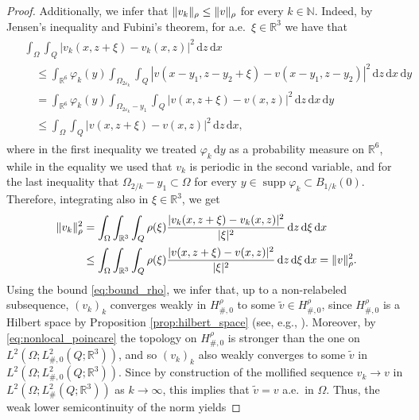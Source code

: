 \documentclass[reqno,11pt]{amsart}
\numberwithin{equation}{section}
\theoremstyle{thmlemcorr}
\numberwithin{theorem}{section}
\theoremstyle{thmlemcorr*}
\theoremstyle{defi}
\theoremstyle{remexample}
\theoremstyle{ass}
\newcommand{\N}{\mathbb{N}}
\newcommand{\R}{\mathbb{R}}
\DeclarePairedDelimiter{\norm}{\lVert}{\rVert}
\newcommand{\1}{\mathds{1}}
\DeclareMathOperator{\supp}{supp}
\newcommand{\Om}{\Omega}
\newcommand{\veps}{\varepsilon}
\newcommand{\dl}{\,\mathrm{d}}
\begin{document}
\begin{proof}
    Additionally, we infer that \(\norm{v_k}_\rho\le \norm{v}_\rho\) for every \(k\in\N\). Indeed, by Jensen's inequality and Fubini's theorem, for a.e.~\(\xi \in \R^3\) we have that
    \begin{align}
        \begin{split}\label{eq:moll_lowers_en}
            &\int_{\Om}\int_Q |v_k(x,z+\xi)-v_k(x,z)|^2{\dl z\dl x}\\
            &\quad\le \int_{\R^6}\varphi_{k}(y)\int_{\Om_{2\veps_k}}\int_Q 
            |v(x-y_1,z-y_2+\xi)-v(x-y_1,z-y_2)|^2 {\dl z\dl x\dl y}\\
            &\quad = \int_{\R^6}\varphi_{k}(y)\int_{\Om_{2\veps_k}-y_1}\int_Q 
            |v(x,z+\xi)-v(x,z)|^2 {\dl z\dl x\dl y}\\
            &\quad \le \int_{\Om}\int_Q |v(x,z+\xi)-v(x,z)|^2{\dl z\dl x},
        \end{split}
    \end{align} where in the first inequality we treated \(\varphi_{k}\dl y\) as a probability measure on \(\R^6\), while in the equality we used that \(v_k\) is periodic in the second variable, and for the last inequality that \(\Om_{2/k}-y_1\subset \Om\) for every \(y\in \supp \varphi_{k}\subset B_{1/k}(0)\). Therefore, integrating also in $\xi \in \R^3$, we get
    \begin{align}\label{eq:bound_rho}
    \begin{split}
       \norm{v_k}^{2}_\rho & = \int_{\Om} \int_{\R^3}\int_Q \rho(\xi) \frac{|v_k(x,z+\xi)-v_k(x,z)|^2}{|\xi|^2} \dl z \dl \xi \dl x \\ &\leq \int_{\Om} \int_{\R^3}\int_Q \rho(\xi) \frac{|v(x,z+\xi)-v(x,z)|^2}{|\xi|^2} \dl z \dl \xi \dl x = \norm{v}^{2}_\rho .
       \end{split}
    \end{align}
    Using the bound \eqref{eq:bound_rho}, we infer that, up to a non-relabeled subsequence, $(v_k)_k$ converges weakly in $H^\rho_{\#,0}$ to some $\tilde{v} \in H^\rho_{\#,0}$, since $H^\rho_{\#,0}$ is a Hilbert space by Proposition \ref{prop:hilbert_space} (see, e.g., \cite[Theorem 3.18]{Bre11}).  Moreover, by \eqref{eq:nonlocal_poincare}  the topology on $H^\rho_{\#,0}$ is stronger than the one on $L^2(\Om;L^2_{\#,0}(Q;\R^3))$, and so $(v_k)_k$ also weakly converges to some $\tilde{v}$ in $L^2(\Om;L^2_{\#,0}(Q;\R^3))$. Since by construction of the mollified sequence \(v_k\to v\) in \(L^2(\Om;L^2_\#(Q;\R^3))\) as $k \to \infty$, 
    this implies that $\tilde{v}=v$ a.e.\ in $\Om$.
    Thus, the weak lower semicontinuity of the norm yields

\end{proof}
\end{document}
